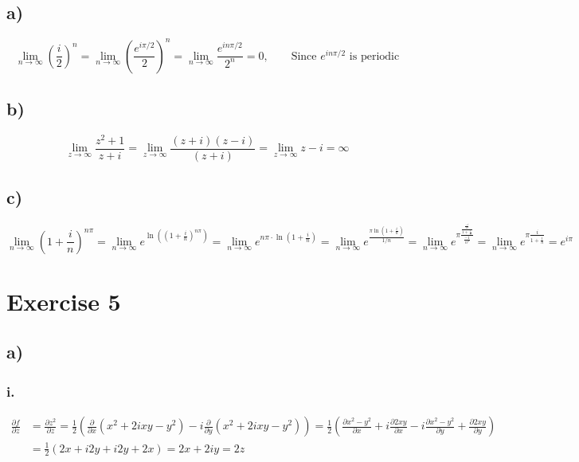 \documentclass{article}
\begin{document}
\subsection*{a)}
\[\lim_{n\to\infty} \left(\frac{i}{2}\right)^n  =\lim_{n\to\infty} \left(\frac{e^{i\pi/2}}{2}\right)^n = \lim_{n\to\infty} \frac{e^{in\pi/2}}{2^n}  = 0, \qquad \text{Since $e^{in\pi/2}$ is periodic} \]


\subsection*{b)}

\[\lim_{z\to\infty} \frac{z^2 + 1}{z + i} = \lim_{z\to\infty} \frac{(z + i)(z-i)}{(z + i)} = \lim_{z\to\infty} z-i =\infty \]



\subsection*{c)}
\[\lim_{n\to\infty} \left(1+ \frac{i}{n}\right)^{n\pi} = \lim_{n\to\infty}e^{\ln\left(\left(1+ \frac{i}{n}\right)^{n\pi}\right)}
=  \lim_{n\to\infty}e^{n\pi\cdot\ln\left(1+ \frac{i}{n}\right)} = \lim_{n\to\infty}e^{\frac{\pi\ln\left(1+ \frac{i}{n}\right)}{1/n}}
= \lim_{n\to\infty}e^{\pi\frac{\frac{\frac{-i}{n^2}}{1+ \frac{i}{n}}}{\frac{-1}{n^2}}} = \lim_{n\to\infty}e^{\pi\frac{i}{1+ \frac{i}{n}}} = e^{i\pi}
\]



\section*{Exercise 5}
\subsection*{a)}
\subsubsection*{i.}
\begin{align*}
\frac{\partial f}{\partial z} &= \frac{\partial z^2}{\partial z}
=\frac{1}{2}\left(\frac{\partial}{\partial x} (x^2+2ixy -y^2)  - i \frac{\partial}{\partial y} (x^2+2ixy -y^2) \right) = \frac{1}{2}\left(\frac{\partial x^2 - y^2}{\partial x} + i\frac{\partial 2xy}{\partial x} - i\frac{\partial x^2 -y^2}{\partial y} + \frac{\partial 2xy}{\partial y}\right) \\
  &= \frac{1}{2}(2x + i2y + i2y + 2x) = 2x + 2iy = 2z
\end{align*}
\end{document}
